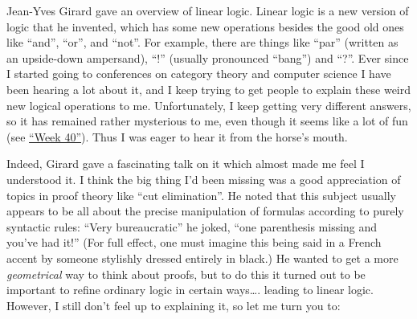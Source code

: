 \documentclass{article}
\renewcommand{\texttt}[1]{%
  \begingroup
  \ttfamily
  \begingroup\lccode`~=`/\lowercase{\endgroup\def~}{/\discretionary{}{}{}}%
  \begingroup\lccode`~=`[\lowercase{\endgroup\def~}{[\discretionary{}{}{}}%
  \begingroup\lccode`~=`.\lowercase{\endgroup\def~}{.\discretionary{}{}{}}%
  \catcode`/=\active\catcode`[=\active\catcode`.=\active
  \scantokens{#1\noexpand}%
  \endgroup
}
\begin{document}

Jean-Yves Girard gave an overview of linear logic. Linear logic is a new
version of logic that he invented, which has some new operations besides
the good old ones like ``and'', ``or'', and ``not''. For example, there
are things like ``par'' (written as an upside-down ampersand), ``!''
(usually pronounced ``bang'') and ``?''. Ever since I started going to
conferences on category theory and computer science I have been hearing
a lot about it, and I keep trying to get people to explain these weird
new logical operations to me. Unfortunately, I keep getting very
different answers, so it has remained rather mysterious to me, even
though it seems like a lot of fun (see \protect\hyperlink{week40}{``Week
40''}). Thus I was eager to hear it from the horse's mouth.

Indeed, Girard gave a fascinating talk on it which almost made me feel I
understood it. I think the big thing I'd been missing was a good
appreciation of topics in proof theory like ``cut elimination''. He
noted that this subject usually appears to be all about the precise
manipulation of formulas according to purely syntactic rules: ``Very
bureaucratic'' he joked, ``one parenthesis missing and you've had it!''
(For full effect, one must imagine this being said in a French accent by
someone stylishly dressed entirely in black.) He wanted to get a more
\emph{geometrical} way to think about proofs, but to do this it turned
out to be important to refine ordinary logic in certain ways\ldots.
leading to linear logic. However, I still don't feel up to explaining
it, so let me turn you to:

\end{document}
